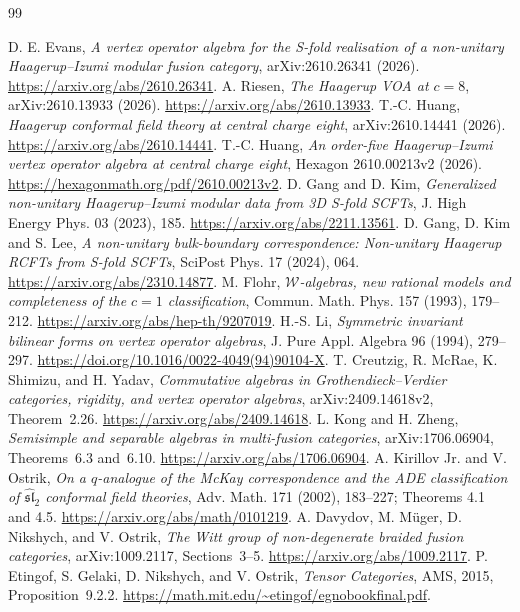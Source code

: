 \documentclass[11pt]{article}
\numberwithin{equation}{section}
\begin{document}
\begin{thebibliography}{99}\footnotesize\raggedright\setlength{\itemsep}{0pt}
 D. E. Evans, \emph{A vertex operator algebra for the S-fold realisation of a non-unitary Haagerup--Izumi modular fusion category}, arXiv:2610.26341 (2026). \url{https://arxiv.org/abs/2610.26341}.
 A. Riesen, \emph{The Haagerup VOA at $c=8$}, arXiv:2610.13933 (2026). \url{https://arxiv.org/abs/2610.13933}.
 T.-C. Huang, \emph{Haagerup conformal field theory at central charge eight}, arXiv:2610.14441 (2026). \url{https://arxiv.org/abs/2610.14441}.
 T.-C. Huang, \emph{An order-five Haagerup--Izumi vertex operator algebra at central charge eight}, Hexagon 2610.00213v2 (2026). \url{https://hexagonmath.org/pdf/2610.00213v2}.
 D. Gang and D. Kim, \emph{Generalized non-unitary Haagerup--Izumi modular data from 3D S-fold SCFTs}, J. High Energy Phys. 03 (2023), 185. \url{https://arxiv.org/abs/2211.13561}.
 D. Gang, D. Kim and S. Lee, \emph{A non-unitary bulk-boundary correspondence: Non-unitary Haagerup RCFTs from S-fold SCFTs}, SciPost Phys. 17 (2024), 064. \url{https://arxiv.org/abs/2310.14877}.
 M. Flohr, \emph{$\mathcal W$-algebras, new rational models and completeness of the $c=1$ classification}, Commun. Math. Phys. 157 (1993), 179--212. \url{https://arxiv.org/abs/hep-th/9207019}.
 H.-S. Li, \emph{Symmetric invariant bilinear forms on vertex operator algebras}, J. Pure Appl. Algebra 96 (1994), 279--297. \url{https://doi.org/10.1016/0022-4049(94)90104-X}.
 T. Creutzig, R. McRae, K. Shimizu, and H. Yadav, \emph{Commutative algebras in Grothendieck--Verdier categories, rigidity, and vertex operator algebras}, arXiv:2409.14618v2, Theorem~2.26. \url{https://arxiv.org/abs/2409.14618}.
 L. Kong and H. Zheng, \emph{Semisimple and separable algebras in multi-fusion categories}, arXiv:1706.06904, Theorems~6.3 and~6.10. \url{https://arxiv.org/abs/1706.06904}.
 A. Kirillov Jr. and V. Ostrik, \emph{On a $q$-analogue of the McKay correspondence and the ADE classification of $\widehat{\mathfrak{sl}}_2$ conformal field theories}, Adv. Math. 171 (2002), 183--227; Theorems 4.1 and 4.5. \url{https://arxiv.org/abs/math/0101219}.
 A. Davydov, M. M\"uger, D. Nikshych, and V. Ostrik, \emph{The Witt group of non-degenerate braided fusion categories}, arXiv:1009.2117, Sections~3--5. \url{https://arxiv.org/abs/1009.2117}.
 P. Etingof, S. Gelaki, D. Nikshych, and V. Ostrik, \emph{Tensor Categories}, AMS, 2015, Proposition~9.2.2. \url{https://math.mit.edu/~etingof/egnobookfinal.pdf}.

\end{thebibliography}
\end{document}
